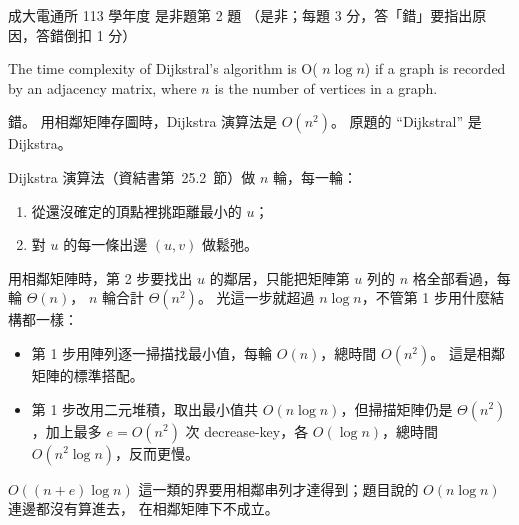 \begin{pastexam}[label={px:ncku-113-cce-02}]{成大電通所 113 學年度 是非題第 2 題}
（是非；每題 3 分，答「錯」要指出原因，答錯倒扣 1 分）

The time complexity of Dijkstral's algorithm is O( $n\log n$) if a graph is recorded by an
adjacency matrix, where $n$ is the number of vertices in a graph.
\end{pastexam}

\begin{pastsoln}
錯。 用相鄰矩陣存圖時，Dijkstra 演算法是 $O(n^2)$。 原題的 ``Dijkstral'' 是 Dijkstra。

Dijkstra 演算法（資結書第~25.2~節）做 $n$ 輪，每一輪：
\begin{enumerate}
\item 從還沒確定的頂點裡挑距離最小的 $u$；
\item 對 $u$ 的每一條出邊 $(u, v)$ 做鬆弛。
\end{enumerate}
用相鄰矩陣時，第 2 步要找出 $u$ 的鄰居，只能把矩陣第 $u$ 列的 $n$ 格全部看過，每輪 $\Theta(n)$，
$n$ 輪合計 $\Theta(n^2)$。 光這一步就超過 $n \log n$，不管第 1 步用什麼結構都一樣：
\begin{itemize}
\item 第 1 步用陣列逐一掃描找最小值，每輪 $O(n)$，總時間 $O(n^2)$。 這是相鄰矩陣的標準搭配。
\item 第 1 步改用二元堆積，取出最小值共 $O(n \log n)$，但掃描矩陣仍是 $\Theta(n^2)$，加上最多
$e = O(n^2)$ 次 decrease-key，各 $O(\log n)$，總時間 $O(n^2 \log n)$，反而更慢。
\end{itemize}
$O((n + e)\log n)$ 這一類的界要用相鄰串列才達得到；題目說的 $O(n \log n)$ 連邊都沒有算進去，
在相鄰矩陣下不成立。
\end{pastsoln}
